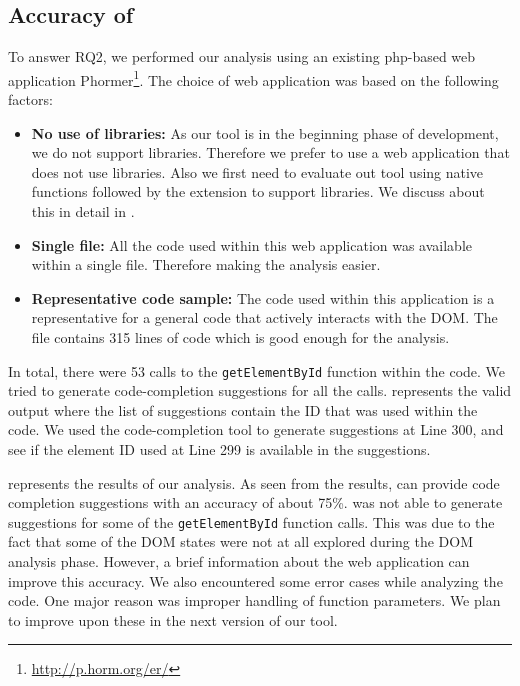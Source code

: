 	
	
	
	\subsection{Accuracy of \dompletion}
	\label{Sec:Accuracy}
	To answer RQ2, we performed our analysis using an existing php-\javascript based web application Phormer\footnote{\url{http://p.horm.org/er/}}. The choice of web application was based on the following factors:
	\begin{itemize}
		\item \textbf{No use of \javascript libraries:} As our tool \dompletion is in the beginning phase of development, we do not support \javascript libraries. Therefore we prefer to use a web application that does not use libraries. Also we first need to evaluate out tool using native \javascript functions followed by the extension to support \javascript libraries. We discuss about this in detail in .
		
		\item \textbf{Single \javascript file:} All the \javascript code used within this web application was available within a single \javascript file. Therefore making the analysis easier.
		
		\item \textbf{Representative code sample:} The \javascript code used within this application is a representative for a general \javascript code that actively interacts with the DOM. The \javascript file contains 315 lines of code which is good enough for the analysis.
		
	\end{itemize}
	
	In total, there were 53 calls to the \texttt{getElementById} function within the \javascript code. We tried to generate code-completion suggestions for all the calls.     represents the valid output where the list of suggestions contain the ID that was used within the code. We used the code-completion tool to generate suggestions at Line 300, and see if the element ID used at Line 299 is available in the suggestions. 
	
	 represents the results of our analysis. As seen from the results, \dompletion can provide code completion suggestions with an accuracy of about 75\%. \dompletion was not able to generate suggestions for some of the \texttt{getElementById} function calls. This was due to the fact that some of the DOM states were not at all explored during the DOM analysis phase. However, a brief information about the web application can improve this accuracy. We also encountered some error cases while analyzing the code. One major reason was improper handling of function parameters. We plan to improve upon these in the next version of our tool.
	
